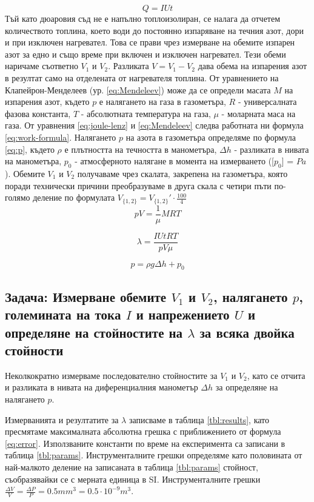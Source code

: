 \documentclass[12pt]{article}
\begin{document}
\begin{equation}\label{eq:joule-lenz}
    Q = IUt
\end{equation}
Тъй като дюаровия съд не е напълно топлоизолиран, се налага да отчетем количеството топлина, което води до постоянно изпаряване на течния азот, дори и при изключен нагревател. Това се прави чрез измерване на обемите изпарен азот за едно и също време при включен и изключен нагревател. Тези обеми наричаме съответно $V_1$ и $V_2$. Разликата $V = V_1 - V_2$ дава обема на изпарения азот в резултат само на отделената от нагревателя топлина. От уравнението на Клапейрон-Менделеев (ур. \ref{eq:Mendeleev}) може да се определи масата $M$ на изпарения азот, където $p$ е налягането на газа в газометъра, $R$ - универсалната фазова константа, $T$ - абсолютната температура на газа, $\mu$ - моларната маса на газа. От уравнения \ref{eq:joule-lenz} и \ref{eq:Mendeleev} следва работната ни формула \ref{eq:work-formula}. Налягането $p$ на азота в газометъра определяме по формула \ref{eq:p}, където $\rho$ е плътността на течността в манометъра, $\Delta h$ - разликата в нивата на манометъра, $p_0$ - атмосферното налягане в момента на измерването ([$p_0$] = $Pa$). Обемите $V_1$ и $V_2$ получаваме чрез скалата, закрепена на газометъра, която поради технически причини преобразуваме в друга скала с четири пъти по-голямо деление по формулата $V_{\{1, 2\}} = V_{\{1, 2\}}'\cdot \frac{100}{4}$
\begin{equation}\label{eq:Mendeleev}
    pV = \frac{1}{\mu}MRT
\end{equation}

\begin{equation}\label{eq:work-formula}
    \lambda = \frac{IUtRT}{pV\mu}
\end{equation}

\begin{equation}\label{eq:p}
    p = \rho g \Delta h + p_0
\end{equation}

  
\subsection{Задача: Измерване обемите $V_1$ и $V_2$, налягането $p$, големината на тока $I$ и напрежението $U$ и определяне на стойностите на $\lambda$ за всяка двойка стойности}
Неколкократно измерваме последователно стойностите за $V_1$ и $V_2$, като се отчита и разликата в нивата на диференциалния манометър $\Delta h$ за определяне на налягането $p$. 

Измерванията и резултатите за $\lambda$ записваме в таблица \ref{tbl:results}, като пресмятаме максималната абсолютна грешка с приближението от формула \ref{eq:error}. Използваните константи по време на експеримента са записани в таблица \ref{tbl:params}. Инструменталните грешки определяме като половината от най-малкото деление на записаната в таблица \ref{tbl:params} стойност, съобразявайки се с мерната единица в SI. Инструменталните грешки $\frac{\Delta V}{V} = \frac{\Delta P}{P} = 0.5 mm^3 = 0.5 \cdot 10^{-9} m^3$.
\end{document}
